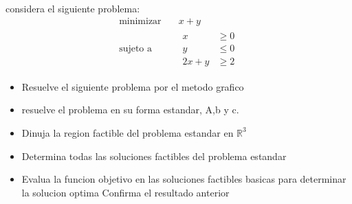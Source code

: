 \documentclass{article}
\begin{document}
considera el siguiente problema:
\begin{equation*}
  \begin{aligned}
      \text{minimizar} \quad & x+y \\
      \text{sujeto a } \quad &
      \begin{aligned}
        x & \geq 0 \\
        y & \leq 0 \\
        2x+y & \geq 2
      \end{aligned}
  \end{aligned}
\end{equation*}
\begin{itemize}
\item Resuelve el siguiente problema por el metodo grafico
\item resuelve el problema en su forma estandar, A,b y c.
\item Dinuja la region factible del problema estandar en $\mathbb{R}^3$
\item Determina todas las soluciones factibles del problema estandar
  \item Evalua la funcion objetivo en las soluciones factibles basicas para determinar la solucion optima Confirma el resultado anterior
  \end{itemize}
\end{document}
